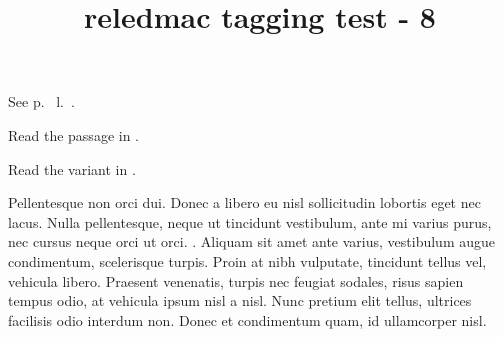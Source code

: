 \documentclass{article}
\title{reledmac tagging test - 8}
\begin{document}
See p.~ l.~.

Read the passage in .

Read the variant in .

\beginnumbering

\pstart
{}Pellentesque non orci dui. Donec a libero eu nisl sollicitudin lobortis eget nec lacus. Nulla pellentesque, neque ut tincidunt vestibulum, ante mi varius purus, nec cursus neque orci ut orci. . Aliquam sit amet ante varius, vestibulum augue condimentum, scelerisque turpis. Proin at nibh vulputate, tincidunt tellus vel, vehicula libero. Praesent venenatis, turpis nec feugiat sodales, risus sapien tempus odio, at vehicula ipsum nisl a nisl. Nunc pretium elit tellus, ultrices facilisis odio interdum non. Donec et condimentum quam, id ullamcorper nisl.
\pend

\endnumbering
\end{document}
